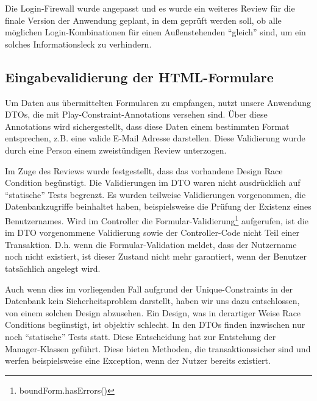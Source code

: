 \documentclass[12pt,DIV14,BCOR10mm,a4paper,parskip=half-,headsepline,headinclude,english,ngerman,bibliography=totocnumbered]{scrreprt}
\begin{document}
Die Login-Firewall wurde angepasst und es wurde ein weiteres Review für die finale Version der Anwendung geplant, in dem geprüft werden soll, ob alle möglichen Login-Kombinationen für einen Außenstehenden \enquote{gleich} sind, um ein solches Informationsleck zu verhindern.

\subsection{Eingabevalidierung der HTML-Formulare}
Um Daten aus übermittelten Formularen zu empfangen, nutzt unsere Anwendung DTOs, die mit Play-Constraint-Annotations versehen sind. Über diese Annotations wird sichergestellt, dass diese Daten einem bestimmten Format entsprechen, z.B. eine valide E-Mail Adresse darstellen. Diese Validierung wurde durch eine Person einem zweistündigen Review unterzogen.

Im Zuge des Reviews wurde festgestellt, dass das vorhandene Design Race Condition begünstigt. Die Validierungen im DTO waren nicht ausdrücklich auf \enquote{statische} Tests begrenzt. Es wurden teilweise Validierungen vorgenommen, die Datenbankzugriffe beinhaltet haben, beispielsweise die Prüfung der Existenz eines Benutzernames. Wird im Controller die Formular-Validierung\footnote{boundForm.hasErrors()} aufgerufen, ist die im DTO vorgenommene Validierung sowie der Controller-Code nicht Teil einer Transaktion. D.h. wenn die Formular-Validation meldet, dass der Nutzername noch nicht existiert, ist dieser Zustand nicht mehr garantiert, wenn der Benutzer tatsächlich angelegt wird.

Auch wenn dies im vorliegenden Fall aufgrund der Unique-Constraints in der Datenbank kein Sicherheitsproblem darstellt, haben wir uns dazu entschlossen, von einem solchen Design abzusehen. Ein Design, was in derartiger Weise Race Conditions begünstigt, ist objektiv schlecht. In den DTOs finden inzwischen nur noch \enquote{statische} Tests statt. Diese Entscheidung hat zur Entstehung der Manager-Klassen geführt. Diese bieten Methoden, die transaktionssicher sind und werfen beispielsweise eine Exception, wenn der Nutzer bereits existiert.
\end{document}
